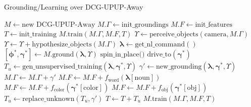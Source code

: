 \begin{algorithm}\footnotesize
\caption{Grounding/Learning over DCG-UPUP-Away}\label{alg:dcg_upup_away}
\begin{algorithmic}[1]
\State $M \gets \text{new DCG-UPUP-Away}$
\State $M.\Gamma \gets \text{init\_groundings}$
\State $M.F \gets \text{init\_features}$
\State $T \gets \text{init\_training}$
\State $M.\text{train}(M.\Gamma, M.F, T)$
\State $\Upsilon \gets \text{perceive\_objects}(\text{camera},M.\Gamma)$
\State $\Upsilon \gets \Upsilon + \text{hypothesize\_objects}(M.\Gamma)$
\State $\boldsymbol{\lambda} \gets \text{get\_nl\_command}()$
\State $[\boldsymbol{\phi}^*,\boldsymbol{\gamma}^*] \gets M.\text{ground}(\boldsymbol{\lambda},\Upsilon)$
\State $\text{spin\_in\_place()}$
\Else
\State $\text{drive\_to}(\boldsymbol{\gamma}^*)$
\EndIf
\State $T_u \gets \text{gen\_unsupervised\_training}(\boldsymbol{\lambda},\boldsymbol{\gamma}^*,\Upsilon)$
\State $\gamma' \gets \text{new\_grounding}(\boldsymbol{\lambda},\boldsymbol{\gamma}^*,\Upsilon)$
\State $M.\Gamma \gets M.\Gamma + \gamma'$
\State $M.F \gets M.F + f_{\text{word}}(\boldsymbol{\lambda}[\text{noun}])$
\State $M.F \gets M.F + f_{\text{color}}(\boldsymbol{\gamma}^*[\text{color}])$
\State $M.F \gets M.F + f_{\text{obj}}(\boldsymbol{\gamma}^*[\text{obj}])$
\State $T_u \gets \text{replace\_unknown}(T_u,\gamma')$
\EndIf
\State $T \gets T + T_u$
\State $M.\text{train}(M.\Gamma, M.F, T)$
\EndWhile
\EndProcedure
\end{algorithmic}
\end{algorithm}

